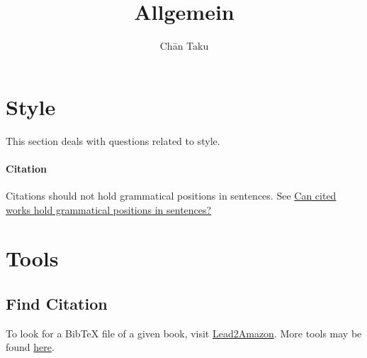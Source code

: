 \documentclass{article}
\title{Allgemein}
\author{Ch\=an Taku}
\begin{document}
\maketitle

\section{Style}

This section deals with questions related to style.

\paragraph{Citation}
Citations should not hold grammatical positions in sentences.
See \href{https://academia.stackexchange.com/questions/49487/can-cited-works-hold-grammatical-positions-in-sentences}{Can cited works hold grammatical positions in sentences?}

\section{Tools}

\subsection{Find Citation}

To look for a BibTeX file of a given book, visit \href{https://lead.to/amazon/com/?key=978-0199566402&si=al&bn=&la=en&cu=usd&op=bt&so=re#first}{Lead2Amazon}.
More tools may be found \href{https://tex.stackexchange.com/questions/58200/what-is-the-best-way-to-get-bibtex-entries-from-isbn-number}{here}.
\end{document}
